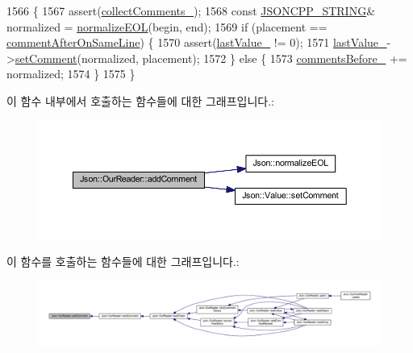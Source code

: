 \begin{DoxyCode}
1566                                                                               \{
1567   assert(\hyperlink{class_json_1_1_our_reader_a259f6ac988da2894bcafc670e42f73ad}{collectComments\_});
1568   \textcolor{keyword}{const} \hyperlink{json-forwards_8h_a1e723f95759de062585bc4a8fd3fa4be}{JSONCPP\_STRING}& normalized = \hyperlink{namespace_json_a63123f3dd63f340ac517a59f44ea7aa4}{normalizeEOL}(begin, end);
1569   \textcolor{keywordflow}{if} (placement == \hyperlink{namespace_json_a4fc417c23905b2ae9e2c47d197a45351a008a230a0586de54f30b76afe70fdcfa}{commentAfterOnSameLine}) \{
1570     assert(\hyperlink{class_json_1_1_our_reader_a9f994b6a2227c5d96e6ed6cbc74ed251}{lastValue\_} != 0);
1571     \hyperlink{class_json_1_1_our_reader_a9f994b6a2227c5d96e6ed6cbc74ed251}{lastValue\_}->\hyperlink{class_json_1_1_value_a29f3a30f7e5d3af6f38d57999bf5b480}{setComment}(normalized, placement);
1572   \} \textcolor{keywordflow}{else} \{
1573     \hyperlink{class_json_1_1_our_reader_a9c53e77e290eb9081298210a955fda6a}{commentsBefore\_} += normalized;
1574   \}
1575 \}
\end{DoxyCode}
이 함수 내부에서 호출하는 함수들에 대한 그래프입니다.\+:\nopagebreak
\begin{figure}[H]
\begin{center}
\leavevmode
\includegraphics[width=350pt]{class_json_1_1_our_reader_ad7318c37469a9106069a236fb4b10e1f_cgraph}
\end{center}
\end{figure}
이 함수를 호출하는 함수들에 대한 그래프입니다.\+:\nopagebreak
\begin{figure}[H]
\begin{center}
\leavevmode
\includegraphics[width=350pt]{class_json_1_1_our_reader_ad7318c37469a9106069a236fb4b10e1f_icgraph}
\end{center}
\end{figure}
\mbox{\label{class_json_1_1_our_reader_aa6a920311e6408ff3a45324d49da18a6}} 
